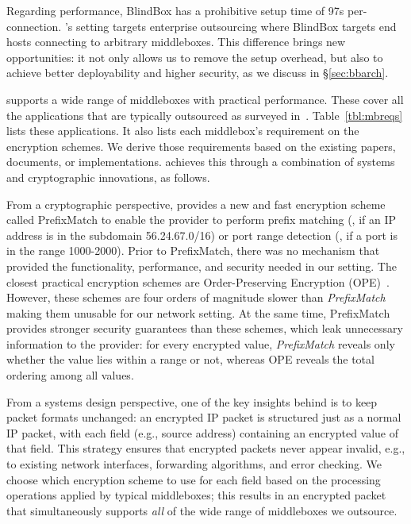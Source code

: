  
Regarding performance, BlindBox has a prohibitive setup time of 97s per-connection. 
\sys's setting targets enterprise outsourcing where BlindBox targets end hosts connecting to arbitrary middleboxes. This difference brings \sys new opportunities: it
not only allows us to remove the setup overhead, but also to achieve better deployability and higher security, as we discuss in \S\ref{sec:bbarch}. 

\sys supports a wide range of middleboxes with practical performance. These cover all the applications that are typically outsourced as surveyed in~\cite{aplomb}. Table~\ref{tbl:mbreqs} lists these applications. It also lists each middlebox's requirement on the encryption schemes. We derive those requirements based on the existing papers, documents, or implementations. \sys achieves this through a combination of systems and cryptographic innovations, as follows.
   
From a cryptographic perspective, \sys provides a new and fast encryption scheme called PrefixMatch  to enable the provider to perform prefix matching (\eg{}, if an IP address is in the subdomain 56.24.67.0/16) or port range detection (\eg{}, if a port is in the range 1000-2000). Prior to PrefixMatch, there was no mechanism that provided the functionality, performance, and  security needed in our setting. The closest practical encryption schemes are Order-Preserving Encryption (OPE)~\cite{boldyreva:ope,popa:mope,popa:cryptdb}. 
However, these schemes are four orders of magnitude slower than {\it PrefixMatch} making them unusable for our network setting. At the same time, PrefixMatch provides stronger security guarantees than these schemes, which leak unnecessary information to the provider: for every encrypted value, {\em PrefixMatch} reveals only whether the value lies within a range or not, whereas OPE reveals the total ordering among all values.

  From a systems design perspective, one of the key insights behind \sys is to keep packet formats unchanged: an encrypted IP packet is structured just as a normal IP packet, with each field (e.g., source address) containing an encrypted value of that field.
  This strategy ensures that encrypted packets never appear invalid, e.g., to existing network interfaces, forwarding algorithms, and error checking. 
  We choose which encryption scheme to use for each field based on the processing operations applied by typical middleboxes; this results in an encrypted packet that simultaneously supports {\it all} of the wide range of middleboxes we outsource.
  
